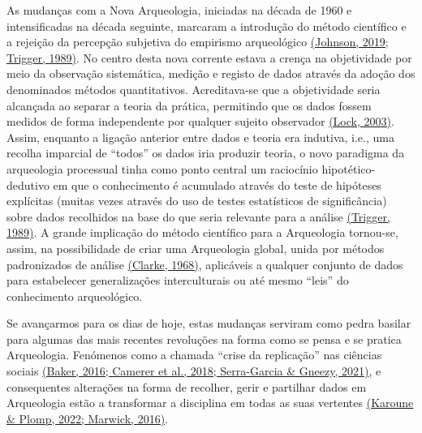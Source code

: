 \documentclass[
  letterpaper,
  DIV=11,
  numbers=noendperiod]{scrreprt}
\begin{document}
As mudanças com a Nova Arqueologia, iniciadas na década de 1960 e
intensificadas na década seguinte, marcaram a introdução do método
científico e a rejeição da percepção subjetiva do empirismo arqueológico
\href{https://www.zotero.org/google-docs/?CILzwr}{(Johnson, 2019;
Trigger, 1989)}. No centro desta nova corrente estava a crença na
objetividade por meio da observação sistemática, medição e registo de
dados através da adoção dos denominados métodos quantitativos.
Acreditava-se que a objetividade seria alcançada ao separar a teoria da
prática, permitindo que os dados fossem medidos de forma independente
por qualquer sujeito observador
\href{https://www.zotero.org/google-docs/?rJCdgi}{(Lock, 2003)}. Assim,
enquanto a ligação anterior entre dados e teoria era indutiva, i.e., uma
recolha imparcial de ``todos'' os dados iria produzir teoria, o novo
paradigma da arqueologia processual tinha como ponto central um
raciocínio hipotético-dedutivo em que o conhecimento é acumulado através
do teste de hipóteses explícitas (muitas vezes através do uso de testes
estatísticos de significância) sobre dados recolhidos na base do que
seria relevante para a análise
\href{https://www.zotero.org/google-docs/?NXPKzw}{(Trigger, 1989)}. A
grande implicação do método científico para a Arqueologia tornou-se,
assim, na possibilidade de criar uma Arqueologia global, unida por
métodos padronizados de análise
\href{https://www.zotero.org/google-docs/?HWbs6f}{(Clarke, 1968)},
aplicáveis a qualquer conjunto de dados para estabelecer generalizações
interculturais ou até mesmo ``leis'' do conhecimento arqueológico.

Se avançarmos para os dias de hoje, estas mudanças serviram como pedra
basilar para algumas das mais recentes revoluções na forma como se pensa
e se pratica Arqueologia. Fenómenos como a chamada ``crise da
replicação'' nas ciências sociais
\href{https://www.zotero.org/google-docs/?bMQmqX}{(Baker, 2016; Camerer
et al., 2018; Serra-Garcia \& Gneezy, 2021)}, e consequentes alterações
na forma de recolher, gerir e partilhar dados em Arqueologia estão a
transformar a disciplina em todas as suas vertentes
\href{https://www.zotero.org/google-docs/?ZU85dR}{(Karoune \& Plomp,
2022; Marwick, 2016)}.
\end{document}
